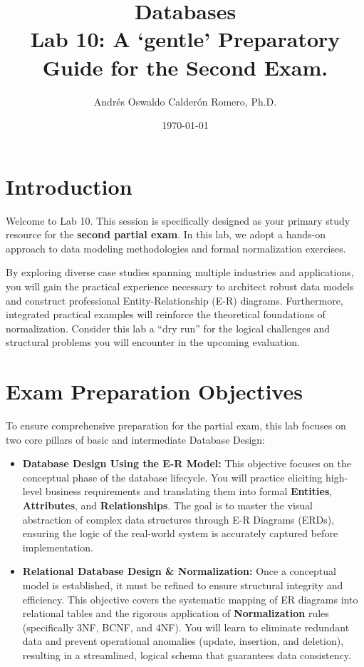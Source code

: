 \documentclass{article}
\title{Databases \\ Lab 10: A `gentle' Preparatory Guide for the Second Exam.}
\author{Andrés Oswaldo Calderón Romero, Ph.D.}
\date{\today}
\begin{document}
\maketitle

\section{Introduction}
Welcome to Lab 10. This session is specifically designed as your primary study resource for the \textbf{second partial exam}. In this lab, we adopt a hands-on approach to data modeling methodologies and formal normalization exercises.

By exploring diverse case studies spanning multiple industries and applications, you will gain the practical experience necessary to architect robust data models and construct professional Entity-Relationship (E-R) diagrams. Furthermore, integrated practical examples will reinforce the theoretical foundations of normalization. Consider this lab a ``dry run'' for the logical challenges and structural problems you will encounter in the upcoming evaluation.

\section{Exam Preparation Objectives}
To ensure comprehensive preparation for the partial exam, this lab focuses on two core pillars of basic and intermediate Database Design:

\begin{itemize}
    \item \textbf{Database Design Using the E-R Model:} This objective focuses on the conceptual phase of the database lifecycle. You will practice eliciting high-level business requirements and translating them into formal \textbf{Entities}, \textbf{Attributes}, and \textbf{Relationships}. The goal is to master the visual abstraction of complex data structures through E-R Diagrams (ERDs), ensuring the logic of the real-world system is accurately captured before implementation.

    \item \textbf{Relational Database Design \& Normalization:} Once a conceptual model is established, it must be refined to ensure structural integrity and efficiency. This objective covers the systematic mapping of ER diagrams into relational tables and the rigorous application of \textbf{Normalization} rules (specifically 3NF, BCNF, and 4NF). You will learn to eliminate redundant data and prevent operational anomalies (update, insertion, and deletion), resulting in a streamlined, logical schema that guarantees data consistency.
\end{itemize}
\end{document}
